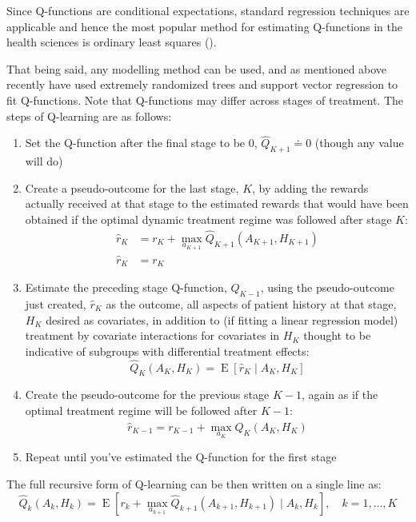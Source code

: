 \documentclass[12pt]{article}
\begin{document}
Since Q-functions are conditional expectations, standard regression techniques are applicable and hence the most popular method for estimating Q-functions in the health sciences is ordinary least squares (\cite{dtr-review}).

That being said, any modelling method can be used, and as mentioned above recently \textcite{crt} have used extremely randomized trees and support vector regression to fit Q-functions. Note that Q-functions may differ across stages of treatment. The steps of Q-learning are as follows:

\begin{enumerate}
  \item Set the Q-function after the final stage to be 0, $\hat{Q}_{K+1} \doteq 0$ (though any value will do)
  \item Create a pseudo-outcome for the last stage, $K$, by adding the rewards actually received at that stage to the estimated rewards that would have been obtained if the optimal dynamic treatment regime was followed after stage $K$:
  \begin{align}
    \hat{r}_{K} &= r_{K} + \max_{a_{K+1}} \hat{Q}_{K+1}(A_{K+1}, H_{K+1}) \\
    \hat{r}_{K} &= r_{K}
  \end{align}
  \item Estimate the preceding stage Q-function, $Q_{K - 1}$, using the pseudo-outcome just created, $\hat{r}_{K}$ as the outcome, all aspects of patient history at that stage, $H_{K}$ desired as covariates, in addition to (if fitting a linear regression model) treatment by covariate interactions for covariates in $H_{K}$ thought to be indicative of subgroups with differential treatment effects:
  \begin{equation}
      \hat{Q}_{K}(A_{K}, H_{K}) = \operatorname{E}[\hat{r}_{K} \mid A_{K}, H_{K}]
  \end{equation}
  \item Create the pseudo-outcome for the previous stage $K - 1$, again as if the optimal treatment regime will be followed after $K - 1$:
  \begin{equation}
    \hat{r}_{K-1} = r_{K-1} + \max_{a_K} \hat{Q}_{K}(A_{K}, H_{K})
  \end{equation}
  \item Repeat until you've estimated the Q-function for the first stage
\end{enumerate}

The full recursive form of Q-learning can be then written on a single line as:
  \begin{equation}
     \hat{Q}_{k}(A_{k}, H_{k})  = \operatorname{E}[r_{k} + \max_{a_{k+1}} \hat{Q}_{k+1}(A_{k+1}, H_{k+1}) \mid A_{k}, H_{k}], \quad k = 1, \ldots, K
  \end{equation}
\end{document}
